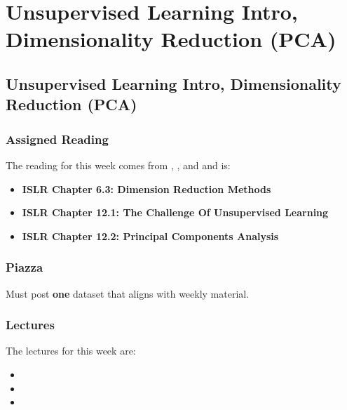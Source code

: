\clearpage

\renewcommand{\ChapTitle}{ Unsupervised Learning Intro, Dimensionality Reduction (PCA)}
\renewcommand{\SectionTitle}{ Unsupervised Learning Intro, Dimensionality Reduction (PCA)}

\chapter{\ChapTitle}
\section{\SectionTitle}

\subsection{Assigned Reading}

The reading for this week comes from \ISLRPython, \ISLRR, and \ESLII \hspace*{1pt} and is:

\begin{itemize}
    \item \textbf{ISLR Chapter 6.3: Dimension Reduction Methods}
    \item \textbf{ISLR Chapter 12.1: The Challenge Of Unsupervised Learning}
    \item \textbf{ISLR Chapter 12.2: Principal Components Analysis}
\end{itemize}

\subsection{Piazza}

Must post \textbf{one} dataset that aligns with weekly material.

\subsection{Lectures}

The lectures for this week are:

\begin{itemize}
    \item {}
    \item {}
    \item {}
\end{itemize}

